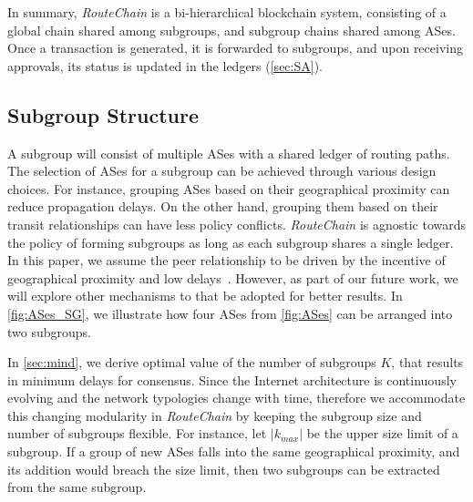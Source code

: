 \documentclass[5p]{elsarticle}
\newcommand{\rc}{{{\em RouteChain}}\xspace}
\begin{document}
In summary, \rc is a bi-hierarchical blockchain system, consisting of a global chain shared among subgroups, and subgroup chains shared among ASes. Once a transaction is generated, it is forwarded to subgroups, and upon receiving approvals, its status is updated in the ledgers (\textsection\ref{sec:SA}).   


\subsection{Subgroup Structure}\label{sec:sg}

A subgroup will consist of multiple ASes with a shared ledger of routing paths. The selection of ASes for a subgroup can be achieved through various design choices. For instance, grouping ASes based on their geographical proximity can reduce propagation delays. On the other hand, grouping them based on their transit relationships can have less policy conflicts. \rc is agnostic towards the policy of forming subgroups as long as each subgroup shares a single ledger. In this paper, we assume the peer relationship to be driven by the incentive of geographical proximity and low delays~\cite{rfc1930}. However, as part of our future work, we will explore other mechanisms to that be adopted for better results. In \autoref{fig:ASes_SG}, we illustrate how four ASes from \autoref{fig:ASes} can be arranged into two subgroups. 

In \textsection\ref{sec:mind}, we derive optimal value of the number of subgroups $K$, that results in minimum delays for consensus. Since the Internet architecture is continuously evolving and the network typologies change with time, therefore we accommodate this changing modularity in \rc by keeping the subgroup size and number of subgroups flexible. For instance, let $|k_{max}|$ be the upper size limit of a subgroup. If a group of new ASes falls into the same geographical proximity, and its addition would breach the size limit, then two subgroups can be extracted from the same subgroup.  
\end{document}
